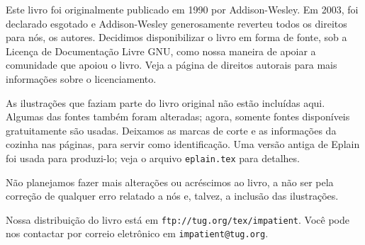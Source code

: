 
\baselineskip

 Este livro foi 
originalmente publicado em 1990 por Addison-Wesley.  Em 2003, foi 
declarado esgotado e Addison-Wesley generosamente reverteu todos os 
direitos para n\'os, os autores.  Decidimos disponibilizar o livro em 
forma de fonte, sob a Licen\c ca de Documenta\c c\~ao Livre GNU, como 
nossa maneira de apoiar a comunidade que apoiou o livro.  Veja a 
p\'agina de direitos autorais para mais informa\c c\~oes sobre o 
licenciamento.

As ilustra\c c\~oes que faziam parte do livro original n\~ao est\~ao 
inclu\'idas aqui.  Algumas das fontes tamb\'em foram alteradas; agora, 
somente fontes dispon\'iveis gratuitamente s\~ao usadas.  Deixamos as 
marcas de corte e as informações da cozinha nas p\'aginas, para servir 
como identifica\c c\~ao.  Uma vers\~ao antiga de Eplain foi usada para 
produzi-lo; veja o arquivo {\tt eplain.tex} para detalhes.

N\~ao planejamos fazer mais altera\c c\~oes ou acr\'escimos ao livro, a 
n\~ao ser pela corre\c c\~ao de qualquer erro relatado a n\'os e, 
talvez, a inclus\~ao das ilustra\c c\~oes.

Nossa distribui\c c\~ao do livro est\'a em 
{\tt ftp://tug.org/tex/impatient}.  Voc\^e pode nos contactar por 
correio eletr\^onico em {\tt impatient@tug.org}.

\pagebreak
\byebye
